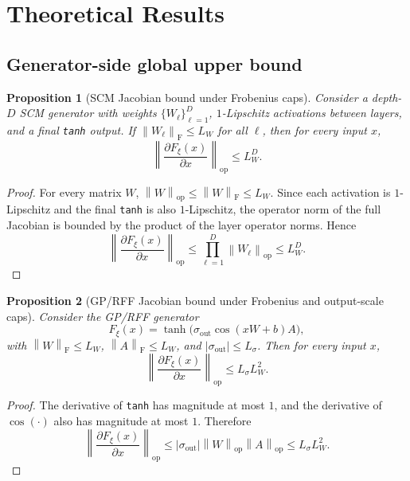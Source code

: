 \documentclass[11pt]{article}
\newtheorem{proposition}{Proposition}
\newcommand{\1}{\mathbf{1}}
\newcommand{\abs}[1]{\left\lvert #1 \right\rvert}
\newcommand{\opnorm}[1]{\left\lVert #1 \right\rVert_{\mathrm{op}}}
\newcommand{\frobnorm}[1]{\left\lVert #1 \right\rVert_{\mathrm{F}}}
\begin{document}
\section{Theoretical Results}
\subsection{Generator-side global upper bound}
\begin{proposition}[SCM Jacobian bound under Frobenius caps]
Consider a depth-$D$ SCM generator with weights $\{W_\ell\}_{\ell=1}^{D}$, $1$-Lipschitz activations between layers, and a final \texttt{tanh} output. If $\frobnorm{W_\ell} \le L_W$ for all $\ell$, then for every input $x$,
\begin{equation}
  \opnorm{\frac{\partial F_{\xi}(x)}{\partial x}} \le L_W^D.
\end{equation}
\end{proposition}

\begin{proof}
For every matrix $W$, $\opnorm{W} \le \frobnorm{W} \le L_W$. Since each activation is $1$-Lipschitz and the final \texttt{tanh} is also $1$-Lipschitz, the operator norm of the full Jacobian is bounded by the product of the layer operator norms. Hence
\[
  \opnorm{\frac{\partial F_{\xi}(x)}{\partial x}}
  \le \prod_{\ell=1}^{D} \opnorm{W_\ell}
  \le L_W^D.
\]
\end{proof}

\begin{proposition}[GP/RFF Jacobian bound under Frobenius and output-scale caps]
Consider the GP/RFF generator
\begin{equation}
  F_{\xi}(x) = \tanh\!\big(\sigma_{\mathrm{out}} \cos(xW+b) A\big),
\end{equation}
with $\frobnorm{W} \le L_W$, $\frobnorm{A} \le L_W$, and $\abs{\sigma_{\mathrm{out}}} \le L_{\sigma}$. Then for every input $x$,
\begin{equation}
  \opnorm{\frac{\partial F_{\xi}(x)}{\partial x}} \le L_{\sigma} L_W^2.
\end{equation}
\end{proposition}

\begin{proof}
The derivative of \texttt{tanh} has magnitude at most $1$, and the derivative of $\cos(\cdot)$ also has magnitude at most $1$. Therefore
\[
  \opnorm{\frac{\partial F_{\xi}(x)}{\partial x}}
  \le \abs{\sigma_{\mathrm{out}}}\opnorm{W}\opnorm{A}
  \le L_{\sigma} L_W^2.
\]
\end{proof}
\end{document}
